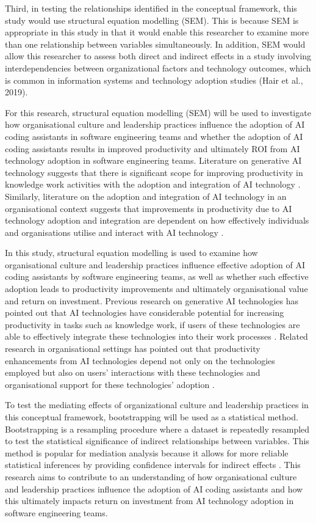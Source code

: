 Third, in testing the relationships identified in the conceptual framework, this study would use structural equation modelling (SEM). This is because SEM is appropriate in this study in that it would enable this researcher to examine more than one relationship between variables simultaneously. In addition, SEM would allow this researcher to assess both direct and indirect effects in a study involving interdependencies between organizational factors and technology outcomes, which is common in information systems and technology adoption studies (Hair et al., 2019).

For this research, structural equation modelling (SEM) will be used to investigate how organisational culture and leadership practices influence the adoption of AI coding assistants in software engineering teams and whether the adoption of AI coding assistants results in improved productivity and ultimately ROI from AI technology adoption in software engineering teams. Literature on generative AI technology suggests that there is significant scope for improving productivity in knowledge work activities with the adoption and integration of AI technology \autocite{Noy2023}. Similarly, literature on the adoption and integration of AI technology in an organisational context suggests that improvements in productivity due to AI technology adoption and integration are dependent on how effectively individuals and organisations utilise and interact with AI technology \autocite{Brynjolfsson2025}.

In this study, structural equation modelling is used to examine how organisational culture and leadership practices influence effective adoption of AI coding assistants by software engineering teams, as well as whether such effective adoption leads to productivity improvements and ultimately organisational value and return on investment. Previous research on generative AI technologies has pointed out that AI technologies have considerable potential for increasing productivity in tasks such as knowledge work, if users of these technologies are able to effectively integrate these technologies into their work processes \autocite{Noy2023}. Related research in organisational settings has pointed out that productivity enhancements from AI technologies depend not only on the technologies employed but also on users’ interactions with these technologies and organisational support for these technologies’ adoption \autocite{Brynjolfsson2025}.

To test the mediating effects of organizational culture and leadership practices in this conceptual framework, bootstrapping will be used as a statistical method. Bootstrapping is a resampling procedure where a dataset is repeatedly resampled to test the statistical significance of indirect relationships between variables. This method is popular for mediation analysis because it allows for more reliable statistical inferences by providing confidence intervals for indirect effects \autocite{Hair2019}.
This research aims to contribute to an understanding of how organisational culture and leadership practices influence the adoption of AI coding assistants and how this ultimately impacts return on investment from AI technology adoption in software engineering teams.

